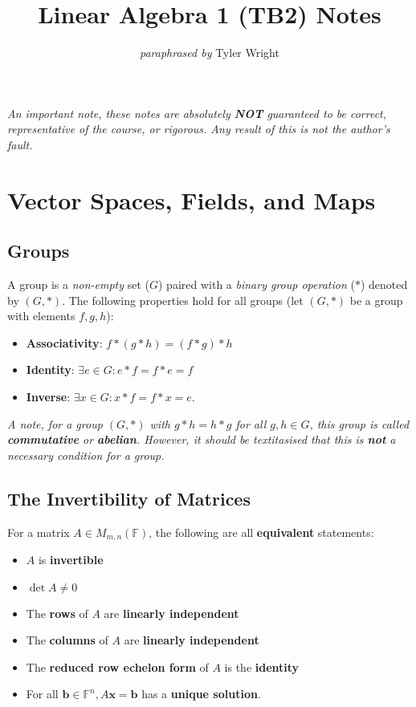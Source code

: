 \documentclass[a4paper, 12pt, twoside]{article}
\begin{document}
\title{Linear Algebra 1 (TB2) Notes}
\date{}
\author{\textit{paraphrased by} Tyler Wright}
\maketitle

\vfill

\textit{An important note, these notes are absolutely \textbf{NOT}
  guaranteed to be correct, representative of the course, or rigorous.
  Any result of this is not the author's fault.}

\newpage

\section{Vector Spaces, Fields, and Maps}

\subsection{Groups}

A group is a \textit{non-empty} set ($G$) paired with a
\textit{binary group operation} ($*$) denoted by $(G, *)$.
The following properties hold for all groups (let $(G, *)$
be a group with elements $f, g, h$):

\begin{itemize}
  \item \textbf{Associativity}: $f * (g * h) = (f * g) * h$
  \item \textbf{Identity}: $\exists e \in G : e * f = f * e = f$
  \item \textbf{Inverse}: $\exists x \in G : x * f = f * x = e$.
\end{itemize}

\textit{A note, for a group $(G, *)$ with $g * h = h * g$ for all $g, h \in G$,
  this group is called \textbf{commutative} or \textbf{abelian}. However, it
  should be textitasised that this is \textbf{not} a necessary condition for
  a group.}

\subsection{The Invertibility of Matrices}

For a matrix $A \in M_{m, n}( \mathbb{F} )$, the following are all
\textbf{equivalent} statements:

\begin{itemize}
  \item $A$ is \textbf{invertible}
  \item $\det{A} \neq 0$
  \item The \textbf{rows} of $A$ are \textbf{linearly independent}
  \item The \textbf{columns} of $A$ are \textbf{linearly independent}
  \item The \textbf{reduced row echelon form} of $A$ is the \textbf{identity}
  \item For all $\textbf{b} \in \mathbb{F}^n, A\textbf{x} = \textbf{b}$ has
        a \textbf{unique solution}.
\end{itemize}
\end{document}
